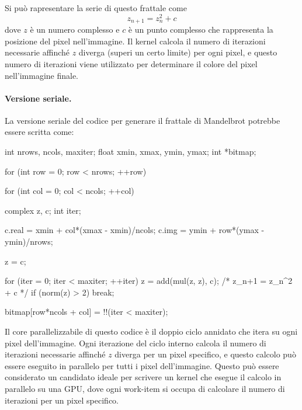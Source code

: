 \noindent
Si può rapresentare la serie di questo frattale come
\[
z_{n+1} = z_n^2 + c
\]
dove \(z\) è un numero complesso e \(c\) è un punto complesso che rappresenta la posizione del pixel nell'immagine. Il kernel calcola il numero di iterazioni necessarie affinché \(z\) diverga (superi un certo limite) per ogni pixel, e questo numero di iterazioni viene utilizzato per determinare il colore del pixel nell'immagine finale.

\paragraph{Versione seriale.}
La versione seriale del codice per generare il frattale di Mandelbrot potrebbe essere scritta come:

\begin{code}[caption={Programma seriale per il calcolo dell'insieme di Mandelbrot},label={lst:mandelbrot}]
int nrows, ncols, maxiter;
float xmin, xmax, ymin, ymax;
int *bitmap;

for (int row = 0; row < nrows; ++row) {
    for (int col = 0; col < ncols; ++col) {
        complex z, c;
        int iter;

        c.real = xmin + col*(xmax - xmin)/ncols;
        c.img  = ymin + row*(ymax - ymin)/nrows;

        z = c;

        for (iter = 0; iter < maxiter; ++iter) {
            z = add(mul(z, z), c); /* z_{n+1} = z_n^2 + c */
            if (norm(z) > 2)
                break;
        }

        bitmap[row*ncols + col] = !!(iter < maxiter);
    }
}
\end{code}

Il core parallelizzabile di questo codice è il doppio ciclo annidato che itera su ogni pixel dell'immagine. Ogni iterazione del ciclo interno calcola il numero di iterazioni necessarie affinché \(z\) diverga per un pixel specifico, e questo calcolo può essere eseguito in parallelo per tutti i pixel dell'immagine. Questo può essere considerato un candidato ideale per scrivere un kernel che esegue il calcolo in parallelo su una GPU, dove ogni work-item si occupa di calcolare il numero di iterazioni per un pixel specifico.

